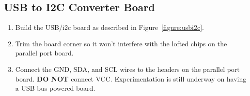 \documentclass[11pt]{article}
\begin{document}
\begin{figure*}[tbp]
\begin{center}
\caption{Layout of USB to i2c board.}
\label{figure:usbi2c}
\end{center}
\end{figure*}

\subsection{USB to I2C Converter Board}

\begin{enumerate}
\item Build the USB/i2c board as described in Figure~\ref{figure:usbi2c}.
\item Trim the board corner so it won't interfere with the lofted
      chips on the parallel port board.
\item Connect the GND, SDA, and SCL wires to the headers on 
      the parallel port board.  {\bf DO NOT} connect VCC.
      Experimentation is still underway on having a USB-bus
      powered board.
\end{enumerate}
\end{document}

